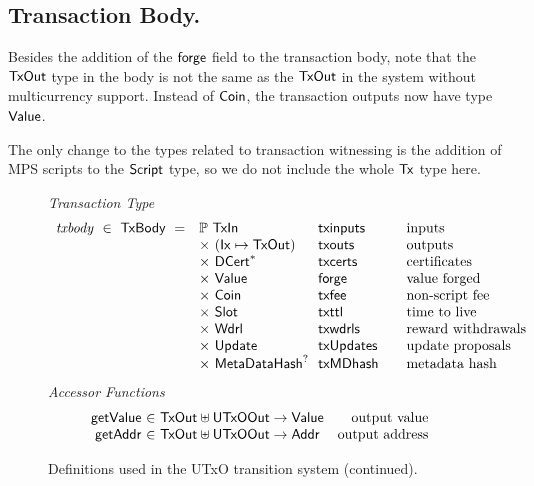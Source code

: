 \subsection*{Transaction Body.}

Besides the addition of the $\mathsf{forge}$ field to the transaction body,
note that the $\mathsf{TxOut}$ type in the body is not the same as
the $\mathsf{TxOut}$ in the system without multicurrency support. Instead of
$\mathsf{Coin}$, the transaction outputs now have type $\mathsf{Value}$.

The only change to the types related to transaction witnessing is the addition
of MPS scripts to the $\mathsf{Script}$ type, so we do not include the whole $\mathsf{Tx}$ type here.

\begin{figure*}[htb]
  \emph{Transaction Type}
  \begin{equation*}
    \begin{array}{r@{~~}l@{~~}l@{\qquad}l}
      \var{txbody} ~\in~ \TxBody ~=~
      & \powerset{\TxIn} & \fun{txinputs}& \text{inputs}\\
      &\times ~(\Ix \mapsto \TxOut) & \fun{txouts}& \text{outputs}\\
      & \times~ \seqof{\DCert} & \fun{txcerts}& \text{certificates}\\
       & \times ~\Value  & \fun{forge} &\text{value forged}\\
       & \times ~\Coin & \fun{txfee} &\text{non-script fee}\\
       & \times ~\Slot & \fun{txttl} & \text{time to live}\\
       & \times~ \Wdrl  & \fun{txwdrls} &\text{reward withdrawals}\\
       & \times ~\Update  & \fun{txUpdates} & \text{update proposals}\\
       & \times ~\MetaDataHash^? & \fun{txMDhash} & \text{metadata hash}\\
    \end{array}
  \end{equation*}
  \emph{Accessor Functions}
  \begin{equation*}
    \begin{array}{r@{~\in~}lr}
      \fun{getValue} & \TxOut \uniondistinct \UTxOOut \to \Value & \text{output value} \\
      \fun{getAddr} & \TxOut \uniondistinct \UTxOOut \to \Addr & \text{output address} \\
    \end{array}
  \end{equation*}
  \caption{Definitions used in the UTxO transition system (continued).}
  \label{fig:defs:utxo-shelley-2}
\end{figure*}

